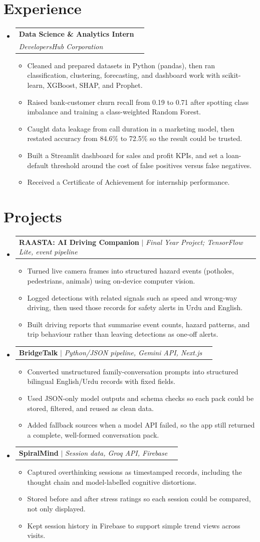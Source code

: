 \documentclass[a4paper,11pt]{article}
\makeatletter
\newcommand{\resumeItem}[1]{
  \item\small{
    {#1 \vspace{-1.5pt}}
  }
}
\newcommand{\resumeSubheading}[4]{
  \vspace{-1pt}\item
    \begin{tabular*}{0.97\textwidth}[t]{l@{\extracolsep{\fill}}r}
      \textbf{#1} & #2 \\
      \textit{\small#3} & \textit{\small #4} \\
    \end{tabular*}\vspace{-6pt}
}
\newcommand{\resumeProjectHeading}[2]{
    \item
    \begin{tabular*}{0.97\textwidth}{l@{\extracolsep{\fill}}r}
      \small#1 & #2 \\
    \end{tabular*}\vspace{-6pt}
}
\newcommand{\resumeSubHeadingListStart}{\begin{itemize}[leftmargin=0.12in, label={}]}
\newcommand{\resumeSubHeadingListEnd}{\end{itemize}}
\newcommand{\resumeItemListStart}{\begin{itemize}[leftmargin=0.15in, itemsep=-1pt]}
\newcommand{\resumeItemListEnd}{\end{itemize}\vspace{-4pt}}
\makeatother
\begin{document}
\section{Experience}
  \resumeSubHeadingListStart
    \resumeSubheading
      {Data Science \& Analytics Intern}{}
      {DevelopersHub Corporation}{}
      \resumeItemListStart
        \resumeItem{Cleaned and prepared datasets in Python (pandas), then ran classification, clustering, forecasting, and dashboard work with scikit-learn, XGBoost, SHAP, and Prophet.}
        \resumeItem{Raised bank-customer churn recall from 0.19 to 0.71 after spotting class imbalance and training a class-weighted Random Forest.}
        \resumeItem{Caught data leakage from call duration in a marketing model, then restated accuracy from 84.6\% to 72.5\% so the result could be trusted.}
        \resumeItem{Built a Streamlit dashboard for sales and profit KPIs, and set a loan-default threshold around the cost of false positives versus false negatives.}
        \resumeItem{Received a Certificate of Achievement for internship performance.}
      \resumeItemListEnd
  \resumeSubHeadingListEnd

\section{Projects}
    \resumeSubHeadingListStart
      \resumeProjectHeading
          {\textbf{RAASTA: AI Driving Companion} $|$ \emph{Final Year Project; TensorFlow Lite, event pipeline}}{}
          \resumeItemListStart
            \resumeItem{Turned live camera frames into structured hazard events (potholes, pedestrians, animals) using on-device computer vision.}
            \resumeItem{Logged detections with related signals such as speed and wrong-way driving, then used those records for safety alerts in Urdu and English.}
            \resumeItem{Built driving reports that summarise event counts, hazard patterns, and trip behaviour rather than leaving detections as one-off alerts.}
          \resumeItemListEnd
      \resumeProjectHeading
          {\textbf{BridgeTalk} $|$ \emph{Python/JSON pipeline, Gemini API, Next.js}}{}
          \resumeItemListStart
            \resumeItem{Converted unstructured family-conversation prompts into structured bilingual English/Urdu records with fixed fields.}
            \resumeItem{Used JSON-only model outputs and schema checks so each pack could be stored, filtered, and reused as clean data.}
            \resumeItem{Added fallback sources when a model API failed, so the app still returned a complete, well-formed conversation pack.}
          \resumeItemListEnd
      \resumeProjectHeading
          {\textbf{SpiralMind} $|$ \emph{Session data, Groq API, Firebase}}{}
          \resumeItemListStart
            \resumeItem{Captured overthinking sessions as timestamped records, including the thought chain and model-labelled cognitive distortions.}
            \resumeItem{Stored before and after stress ratings so each session could be compared, not only displayed.}
            \resumeItem{Kept session history in Firebase to support simple trend views across visits.}
          \resumeItemListEnd
    \resumeSubHeadingListEnd
\end{document}
